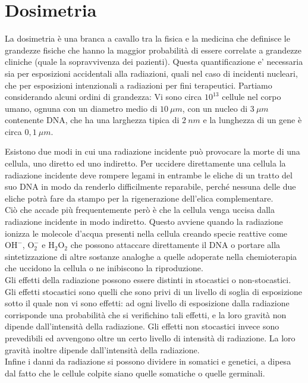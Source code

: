 
\chapter{Dosimetria}
La dosimetria è una branca a cavallo tra la fisica e la medicina che definisce le grandezze fisiche che hanno la maggior probabilità di essere correlate a grandezze cliniche (quale la sopravvivenza dei pazienti). Questa quantificazione e' necessaria sia per esposizioni accidentali alla radiazioni, quali nel caso di incidenti nucleari, che per esposizioni intenzionali a radiazioni per fini terapeutici. Partiamo considerando alcuni ordini di grandezza:
Vi sono circa $10^{13}$ cellule nel corpo umano, ognuna con un diametro medio di $10 \ \mu m$, con un nucleo di $3 \ \mu m$ contenente DNA, che ha una larghezza tipica di $ 2 \ nm$ e la lunghezza di un gene è circa $0,1 \ \mu m$. 

Esistono due modi in cui una radiazione incidente può provocare la morte di una cellula, uno diretto ed uno indiretto. Per uccidere direttamente una cellula la radiazione incidente deve rompere legami in entrambe le eliche di un tratto del suo DNA in modo da renderlo difficilmente reparabile, perché nessuna delle due eliche potrà fare da stampo per la rigenerazione dell'elica complementare. \\
Ciò che accade più frequentemente però è che la cellula venga uccisa dalla radiazione incidente in modo indiretto. Questo avviene quando la radiazione ionizza le molecole d'acqua presenti nella cellula creando specie reattive come $\text{OH}^{-}$, $\text{O}_2^{-}$ e $\text{H}_2\text{O}_2$ che possono attaccare direttamente il DNA o portare alla sintetizzazione di altre sostanze analoghe a quelle adoperate nella chemioterapia che uccidono la cellula o ne inibiscono la riproduzione.\\
Gli effetti della radiazione possono essere distinti in stocastici o non-stocastici. Gli effetti stocastici sono quelli che sono privi di un livello di soglia di esposizione sotto il quale non vi sono effetti: ad ogni livello di esposizione dalla radiazione corrisponde una probabilità che si verifichino tali effetti, e la loro gravità non dipende dall'intensità della radiazione. Gli effetti non stocastici invece sono prevedibili ed avvengono oltre un certo livello di intensità di radiazione. La loro gravità inoltre dipende dall'intensità della radiazione.\\
Infine i danni da radiazione si possono dividere in somatici e genetici, a dipesa dal fatto che le cellule colpite siano quelle somatiche o quelle germinali.


